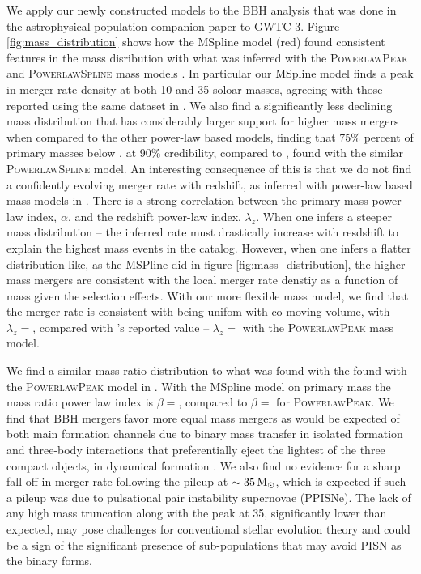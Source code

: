 We apply our newly constructed models to the BBH analysis that was done in the astrophysical population companion paper to GWTC-3. 
Figure \ref{fig:mass_distribution} shows how the MSpline model (red) found consistent features in the mass disribution with 
what was inferred with the \textsc{PowerlawPeak} and \textsc{PowerlawSpline} mass models \cite{Talbot_2019,o3a_pop,Edelman_2022ApJ,o3b_astro_dist}. 
In particular our MSpline model finds a peak in merger rate density at both 10 and 35 soloar masses, agreeing with those reported using the same dataset in \citet{o3b_astro_dist}. 
We also find a significantly less declining mass distribution that has considerably larger support for higher mass mergers when 
compared to the other power-law based models, finding that 75\% percent of primary masses below \result{$\CIPlusMinus{\macros[MassDistribution][MSpline][m_75percentile]}$}, 
at 90\% credibility, compared to \result{$\CIPlusMinus{\macros[MassDistribution][PLSpline][m_75percentile]}$}, found with the similar \textsc{PowerlawSpline} model. 
An interesting consequence of this is that we do not find a confidently evolving merger rate with redshift, as inferred with power-law based mass models in \citet{o3b_astro_dist}. 
There is a strong correlation between the primary mass power law index, $\alpha$, and the redshift power-law index, $\lambda_z$. When one infers a steeper mass distribution -- 
the inferred rate must drastically increase with resdshift to explain the highest mass events in the catalog. However, when one infers a 
flatter distribution like, as the MSPline did in figure \ref{fig:mass_distribution}, the higher mass mergers are consistent with 
the local merger rate denstiy as a function of mass given the selection effects. With our more flexible mass model, we find that the merger rate 
is consistent with being unifom with co-moving volume, with $\lambda_z = $\result{$\CIPlusMinus{\macros[MSplineIIDCompSpins][lamb]}$}, compared with 
\citet{o3b_astro_dist}'s reported value -- $\lambda_z = $\result{$\CIPlusMinus{\macros[PLPeak][lamb]}$} with the \textsc{PowerlawPeak} mass model.

We find a similar mass ratio distribution to what was found with the found with the \textsc{PowerlawPeak} model in \citet{o3b_astro_dist}. 
With the MSpline model on primary mass the mass ratio power law index is $\beta = $\result{$\CIPlusMinus{\macros[MSplineIIDCompSpins][beta]}$}, 
compared to $\beta = $\result{$\CIPlusMinus{\macros[PLPeak][beta]}$} for \textsc{PowerlawPeak}. We find that BBH mergers favor more equal mass mergers
as would be expected of both main formation channels due to binary mass transfer in isolated formation and three-body interactions that preferentially eject
the lightest of the three compact objects, in dynamical formation . We also find no evidence for a sharp fall off in merger rate following 
the pileup at $\sim35\,{\rm M}_\odot$, which is expected if such a pileup was due to pulsational pair instability supernovae (PPISNe). The lack of any high mass truncation 
along with the peak at 35\msun, significantly lower than expected, may pose challenges for conventional stellar evolution theory and could be a sign of 
the significant presence of sub-populations that may avoid PISN as the binary forms. 

